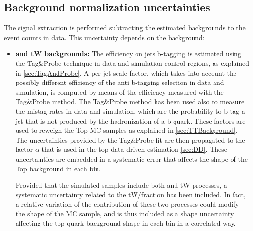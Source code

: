 \subsection{Background normalization uncertainties}

The signal extraction is performed subtracting the estimated backgrounds to the event counts in data.
This uncertainty depends on the background: 
  \begin{itemize}
    \item {\bf\boldmath \ttbar and tW backgrounds:} 
      The efficiency on jets b-tagging is estimated using the Tag\&Probe technique in data
      and simulation control regions, as explained in \ref{sec:TagAndProbe}. 
      A per-jet scale factor, which takes into account the possibly different efficiency of the anti b-tagging selection in data and simulation, 
      is computed by means of the efficiency measured with the Tag\&Probe method.
      The Tag\&Probe method has been used also to measure the mistag rates in data and simulation, which are the probability to b-tag a jet that is not produced by the hadronization of a b quark.
      These factors are used to reweigh the Top MC samples as explained in \ref{sec:TTBackground}. The uncertainties provided by the Tag\&Probe fit are then propagated to the factor $\alpha$ that is used in the top data driven estimation \ref{sec:DD}.
      These uncertainties are embedded in a systematic error that affects the shape of the Top background in each \pth bin.
      
      Provided that the simulated samples include both \ttbar and tW processes, a systematic uncertainty related to the tW$/$\ttbar fraction has been included.
      In fact, a relative variation of the contribution of these two processes could modify the shape of the MC sample, and is thus included as a shape uncertainty affecting the top quark background shape in each \pth bin in a correlated way. 
 

\end{itemize}
